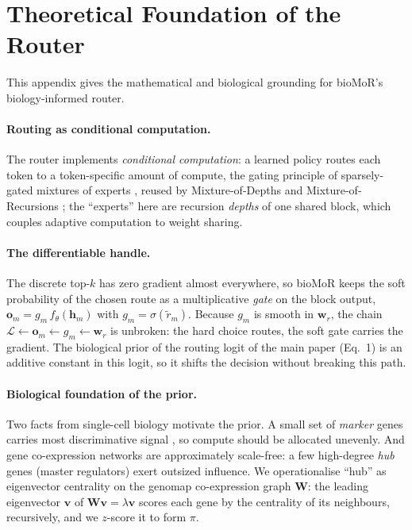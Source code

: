 \documentclass[letterpaper]{article}
\begin{document}
\section{Theoretical Foundation of the Router}
\label{app:theory}
This appendix gives the mathematical and biological grounding for bioMoR's
biology-informed router.

\paragraph{Routing as conditional computation.}
The router implements \emph{conditional computation}: a learned policy routes each token
to a token-specific amount of compute, the gating principle of sparsely-gated mixtures
of experts \cite{shazeer2017outrageously}, reused by Mixture-of-Depths
\cite{raposo2024mixture} and Mixture-of-Recursions \cite{bae2025mixture}; the
``experts'' here are recursion \emph{depths} of one shared block, which couples adaptive
computation \cite{graves2016adaptive} to weight sharing.

\paragraph{The differentiable handle.}
The discrete top-$k$ has zero gradient almost everywhere, so bioMoR keeps the soft
probability of the chosen route as a multiplicative \emph{gate} on the block output,
$\mathbf{o}_m=g_m\,f_\theta(\mathbf{h}_m)$ with $g_m=\sigma(\tilde r_m)$. Because $g_m$
is smooth in $\mathbf{w}_r$, the chain
$\mathcal{L}\!\leftarrow\!\mathbf{o}_m\!\leftarrow\!g_m\!\leftarrow\!\mathbf{w}_r$ is
unbroken: the hard choice routes, the soft gate carries the gradient. The biological
prior of the routing logit of the main paper (Eq.~1) is an additive constant in this logit, so it shifts
the decision without breaking this path.

\paragraph{Biological foundation of the prior.}
Two facts from single-cell biology motivate the prior. A small set of \emph{marker}
genes carries most discriminative signal
\cite{ianevski2022fully,franzen2019panglaodb,hu2023cellmarker}, so compute should be
allocated unevenly. And gene co-expression networks are approximately scale-free: a few
high-degree \emph{hub} genes (master regulators) exert outsized influence. We
operationalise ``hub'' as eigenvector centrality on the genomap co-expression graph
$\mathbf{W}$: the leading eigenvector $\mathbf{v}$ of
$\mathbf{W}\mathbf{v}=\lambda\mathbf{v}$ scores each gene by the centrality of its
neighbours, recursively, and we $z$-score it to form $\pi$.
\end{document}
